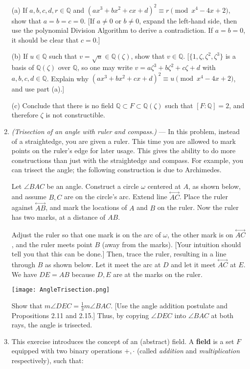 \documentclass[leqno]{book}
\begin{document}
\begin{enumerate}
(a) If $a,b,c,d,r\in\mathbb Q$ and $(ax^3+bx^2+cx+d)^2\equiv r\pmod{x^4-4x+2}$, show that $a=b=c=0$.  [If $a\ne 0$ or $b\ne 0$, expand the left-hand side, then use the polynomial Division Algorithm to derive a contradiction.  If $a=b=0$, it should be clear that $c=0$.]

(b) If $u\in\mathbb Q$ such that $v=\sqrt u\in\mathbb Q(\zeta)$, show that $v\in\mathbb Q$.  [$\{1,\zeta,\zeta^2,\zeta^3\}$ is a basis of $\mathbb Q(\zeta)$ over $\mathbb Q$, so one may write $v=a\zeta^3+b\zeta^2+c\zeta+d$ with $a,b,c,d\in\mathbb Q$.  Explain why $(ax^3+bx^2+cx+d)^2\equiv u\pmod{x^4-4x+2}$, and use part (a).]

(c) Conclude that there is no field $\mathbb Q\subset F\subset\mathbb Q(\zeta)$ such that $[F:\mathbb Q]=2$, and therefore $\zeta$ is not constructible.

\item\emph{(Trisection of an angle with ruler and compass.)} \---- In this problem, instead of a straightedge, you are given a ruler.  This time you are allowed to mark points on the ruler's edge for later usage.  This gives the ability to do more constructions than just with the straightedge and compass.  For example, you can trisect the angle; the following construction is due to Archimedes.

Let $\angle BAC$ be an angle.  Construct a circle $\omega$ centered at $A$, as shown below, and assume $B,C$ are on the circle's arc.  Extend line $\overset{\longleftrightarrow}{AC}$.  Place the ruler against $\overset{\longleftrightarrow}{AB}$, and mark the locations of $A$ and $B$ on the ruler.  Now the ruler has two marks, at a distance of $AB$.

Adjust the ruler so that one mark is on the arc of $\omega$, the other mark is on $\overset{\longleftrightarrow}{AC}$, and the ruler meets point $B$ (away from the marks).  [Your intuition should tell you that this can be done.]  Then, trace the ruler, resulting in a line through $B$ as shown below.  Let it meet the arc at $D$ and let it meet $\overset{\longleftrightarrow}{AC}$ at $E$.  We have $DE=AB$ because $D,E$ are at the marks on the ruler.
\begin{center}\texttt{[image: AngleTrisection.png]}\end{center}
Show that $m\angle DEC=\frac 13m\angle BAC$.  [Use the angle addition postulate and Propositions 2.11 and 2.15.]  Thus, by copying $\angle DEC$ into $\angle BAC$ at both rays, the angle is trisected.

\item This exercise introduces the concept of an (abstract) field.  A \textbf{field} is a set $F$ equipped with two binary operations $+,\cdot$ (called \emph{addition} and \emph{multiplication} respectively), such that:


\end{enumerate}
\end{document}
